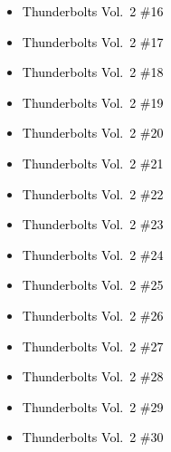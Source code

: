 \documentclass[12pt]{article}
\newcommand{\checkbox}{\raisebox{0.0ex}{\fbox{\rule{0ex}{1.5ex} \rule{1.5ex}{0ex}}}}
\begin{document}
\vspace{0.3cm}
\noindent
\begin{tcolorbox}[
  colback=white!95!gray,
  colframe=black,
  width=\textwidth,
  arc=4mm,
  auto outer arc,
  boxrule=0.8pt,
  left=8pt,right=8pt,top=8pt,bottom=8pt
]
\begin{itemize}[left=0pt,label={\checkbox}]
    \item \textcolor{black}{Thunderbolts Vol.\ 2 \#16}
    \item \textcolor{black}{Thunderbolts Vol.\ 2 \#17}
    \item \textcolor{black}{Thunderbolts Vol.\ 2 \#18}
    \item \textcolor{black}{Thunderbolts Vol.\ 2 \#19}
    \item \textcolor{black}{Thunderbolts Vol.\ 2 \#20}
    \item \textcolor{black}{Thunderbolts Vol.\ 2 \#21}
    \item \textcolor{black}{Thunderbolts Vol.\ 2 \#22}
    \item \textcolor{black}{Thunderbolts Vol.\ 2 \#23}
    \item \textcolor{black}{Thunderbolts Vol.\ 2 \#24}
    \item \textcolor{black}{Thunderbolts Vol.\ 2 \#25}
    \item \textcolor{black}{Thunderbolts Vol.\ 2 \#26}
    \item \textcolor{black}{Thunderbolts Vol.\ 2 \#27}
    \item \textcolor{black}{Thunderbolts Vol.\ 2 \#28}
    \item \textcolor{black}{Thunderbolts Vol.\ 2 \#29}
    \item \textcolor{black}{Thunderbolts Vol.\ 2 \#30}
\end{itemize}
\end{tcolorbox}

\newpage
{}
\end{document}
